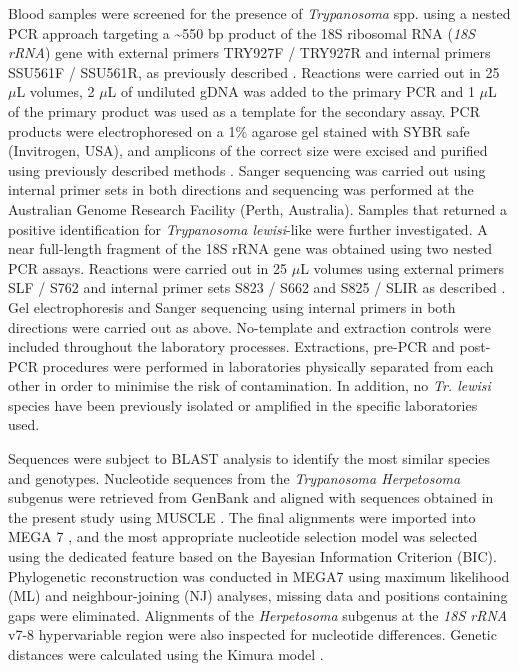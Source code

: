 \documentclass[a4paper, nobind]{templates/ociamthesis}
\begin{document}
Blood samples were screened for the presence of \emph{Trypanosoma} spp. using a nested PCR approach targeting a \textasciitilde550 bp product of the 18S ribosomal RNA (\emph{18S rRNA}) gene with external primers TRY927F / TRY927R and internal primers SSU561F / SSU561R, as previously described \autocite{noyesNestedPCRSsrRNA1999}. Reactions were carried out in 25 \(\mu\)L volumes, 2 \(\mu\)L of undiluted gDNA was added to the primary PCR and 1 \(\mu\)L of the primary product was used as a template for the secondary assay. PCR products were electrophoresed on a 1\% agarose gel stained with SYBR safe (Invitrogen, USA), and amplicons of the correct size were excised and purified using previously described methods \autocite{yangSpecificQuantitativeDetection2013}. Sanger sequencing was carried out using internal primer sets in both directions and sequencing was performed at the Australian Genome Research Facility (Perth, Australia). Samples that returned a positive identification for \emph{Trypanosoma lewisi}-like were further investigated. A near full-length fragment of the 18S rRNA gene was obtained using two nested PCR assays. Reactions were carried out in 25 \(\mu\)L volumes using external primers SLF / S762 and internal primer sets S823 / S662 and S825 / SLIR as described \autocite{mcinnesTrypanosomaIrwiniSp2009}. Gel electrophoresis and Sanger sequencing using internal primers in both directions were carried out as above. No-template and extraction controls were included throughout the laboratory processes. Extractions, pre-PCR and post-PCR procedures were performed in laboratories physically separated from each other in order to minimise the risk of contamination. In addition, no \emph{Tr. lewisi} species have been previously isolated or amplified in the specific laboratories used.

Sequences were subject to BLAST analysis to identify the most similar species and genotypes. Nucleotide sequences from the \emph{Trypanosoma Herpetosoma} subgenus were retrieved from GenBank \autocite{bensonGenBank2017} and aligned with sequences obtained in the present study using MUSCLE \autocite{edgarMUSCLEMultipleSequence2004}. The final alignments were imported into MEGA 7 \autocite{kumarMEGA7MolecularEvolutionary2016}, and the most appropriate nucleotide selection model was selected using the dedicated feature based on the Bayesian Information Criterion (BIC). Phylogenetic reconstruction was conducted in MEGA7 using maximum likelihood (ML) and neighbour-joining (NJ) analyses, missing data and positions containing gaps were eliminated. Alignments of the \emph{Herpetosoma} subgenus at the \emph{18S rRNA} v7-8 hypervariable region were also inspected for nucleotide differences. Genetic distances were calculated using the Kimura model \autocite{edgarMUSCLEMultipleSequence2004}.
\end{document}
